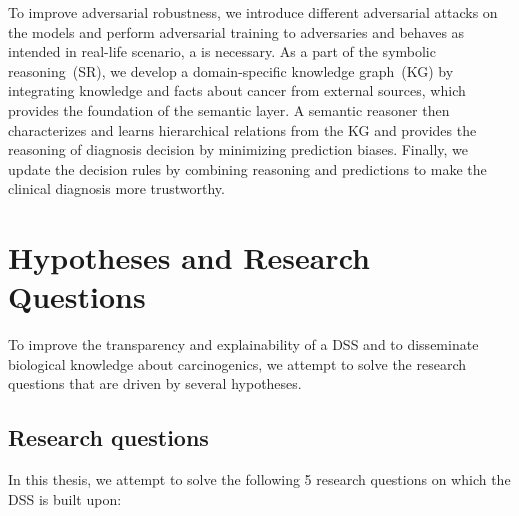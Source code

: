 \hspace*{3.5mm} To improve adversarial robustness, we introduce different adversarial attacks on the models and perform adversarial training to adversaries and behaves as intended in real-life scenario, a is necessary. As a part of the symbolic reasoning~(SR), we develop a domain-specific knowledge graph~(KG) by integrating knowledge and facts about cancer from external sources, which provides the foundation of the semantic layer. A semantic reasoner then characterizes and learns hierarchical relations from the KG and provides the reasoning of diagnosis decision by minimizing prediction biases. 
Finally, we update the decision rules by combining reasoning and predictions to make the clinical diagnosis more trustworthy. 

\section{Hypotheses and Research Questions} \label{hypotheses}
To improve the transparency and explainability of a DSS and to disseminate biological knowledge about carcinogenics, we attempt to solve the research questions that are driven by several hypotheses.  

\subsection{Research questions}
In this thesis, we attempt to solve the following 5 research questions on which the DSS is built upon:  

